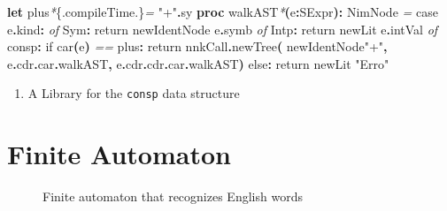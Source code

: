 \documentclass[
  12pt,
]{book}
\newenvironment{Shaded}{}{}
\newcommand{\AttributeTok}[1]{\textcolor[rgb]{0.49,0.56,0.16}{#1}}
\newcommand{\CommentTok}[1]{\textcolor[rgb]{0.38,0.63,0.69}{\textit{#1}}}
\newcommand{\DataTypeTok}[1]{\textcolor[rgb]{0.56,0.13,0.00}{#1}}
\newcommand{\KeywordTok}[1]{\textcolor[rgb]{0.00,0.44,0.13}{\textbf{#1}}}
\newcommand{\NormalTok}[1]{#1}
\newcommand{\StringTok}[1]{\textcolor[rgb]{0.25,0.44,0.63}{#1}}
\providecommand{\tightlist}{%
  \setlength{\itemsep}{0pt}\setlength{\parskip}{0pt}}
\begin{document}
\begin{Shaded}
\begin{Highlighting}[]
\KeywordTok{let}\NormalTok{ plus}\CommentTok{*}\AttributeTok{\{.compileTime.\}}\CommentTok{=}  \StringTok{"+"}\KeywordTok{.}\DataTypeTok{sy}
\KeywordTok{proc }\StringTok{walkAST}\CommentTok{*}\KeywordTok{(}\NormalTok{e}\KeywordTok{:}\DataTypeTok{SExpr}\KeywordTok{):} \DataTypeTok{NimNode} \CommentTok{=}
   \DataTypeTok{case}\NormalTok{ e}\KeywordTok{.}\DataTypeTok{kind}\KeywordTok{:}
     \CommentTok{of} \DataTypeTok{Sym}\KeywordTok{:} \DataTypeTok{return} \DataTypeTok{newIdentNode}\NormalTok{ e}\KeywordTok{.}\DataTypeTok{symb}
     \CommentTok{of} \DataTypeTok{Intp}\KeywordTok{:} \DataTypeTok{return} \DataTypeTok{newLit}\NormalTok{ e}\KeywordTok{.}\DataTypeTok{intVal}
     \CommentTok{of}\NormalTok{ consp}\KeywordTok{:}
       \DataTypeTok{if} \DataTypeTok{car}\KeywordTok{(}\NormalTok{e}\KeywordTok{)} \CommentTok{==}\NormalTok{ plus}\KeywordTok{:}
         \DataTypeTok{return}\NormalTok{ nnkCall}\KeywordTok{.}\DataTypeTok{newTree}\KeywordTok{(}\NormalTok{ newIdentNode}\StringTok{"+"}\KeywordTok{,}
\NormalTok{                                 e}\KeywordTok{.}\DataTypeTok{cdr}\KeywordTok{.}\DataTypeTok{car}\KeywordTok{.}\DataTypeTok{walkAST}\KeywordTok{,}
\NormalTok{                                 e}\KeywordTok{.}\DataTypeTok{cdr}\KeywordTok{.}\DataTypeTok{cdr}\KeywordTok{.}\DataTypeTok{car}\KeywordTok{.}\DataTypeTok{walkAST}\KeywordTok{)}
     \DataTypeTok{else}\KeywordTok{:} \DataTypeTok{return} \DataTypeTok{newLit} \StringTok{"Erro"}
\end{Highlighting}
\end{Shaded}

\begin{enumerate}
\def\labelenumi{(\arabic{enumi})}
\setcounter{enumi}{21}
\tightlist
\item
  A Library for the \texttt{consp} data structure
\end{enumerate}

\chapter{Finite Automaton}\label{finite-automaton}

\begin{figure}[!h]
\renewcommand\figurename{Fig.}
\caption{Finite automaton that recognizes English words}
\label{fig:automaton}
\end{figure}
\end{document}

